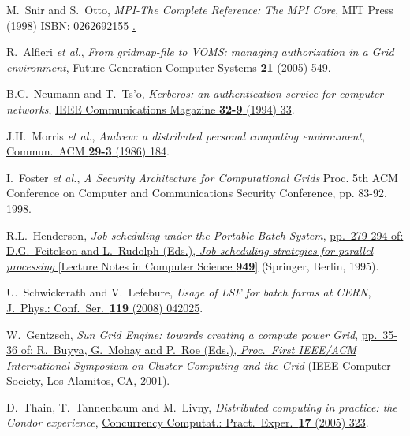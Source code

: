 \documentclass{elsart}
\def\etal {\textit{et al.}}
\begin{document}
\begin{linenumbers}
\begin{thebibliography}{00}
 M.~Snir and S.~Otto, \textit{MPI-The Complete Reference: The MPI Core}, 
{MIT Press (1998) ISBN: 0262692155}
\href{http://www.mpi-forum.org}.


 R.~Alfieri \etal,
\textit{From gridmap-file to VOMS: managing authorization in a Grid
environment},
\href{http://dx.doi.org/10.1016/j.future.2004.10.006}
{Future Generation Computer Systems \textbf{21} (2005) 549.}

 B.C.~Neumann and T.~Ts'o,
\textit{Kerberos: an authentication service for computer networks},
\href{http://dx.doi.org/10.1109/35.312841}
{IEEE Communications Magazine \textbf{32-9} (1994) 33}.

 J.H.~Morris \etal,
\textit{Andrew: a distributed personal computing environment},
\href{http://dx.doi.org/10.1145/5666.5671}
{Commun.\ ACM \textbf{29-3} (1986) 184}.

 I.~Foster \etal,
\textit{A Security Architecture for Computational Grids}
{Proc. 5th ACM Conference on Computer and Communications Security Conference, pp. 83-92, 1998.}


 R.L.~Henderson,
\textit{Job scheduling under the Portable Batch System},
\href{http://dx.doi.org/10.1007/3-540-60153-8}
{pp.~279-294 of: D.G.~Feitelson and L.~Rudolph (Eds.),
\textit{Job scheduling strategies for parallel processing}
[Lecture Notes in Computer Science \textbf{949}]} (Springer, Berlin, 1995).

 U.~Schwickerath and V.~Lefebure,
\textit{Usage of LSF for batch farms at CERN},
\href{http://dx.doi.org/10.1088/1742-6596/119/4/042025}
{J.~Phys.: Conf.\ Ser.\ \textbf{119} (2008) 042025}.

 W.~Gentzsch,
\textit{Sun Grid Engine: towards creating a compute power Grid},
\href{http://dx.doi.org/10.1109/CCGRID.2001.923173}
{pp.~35-36 of: R.~Buyya, G.~Mohay and P.~Roe (Eds.),
\textit{Proc.\ First IEEE/ACM International Symposium on Cluster
Computing and the Grid}} (IEEE Computer Society, Los Alamitos, CA, 2001).

 D.~Thain, T.~Tannenbaum and M.~Livny,
\textit{Distributed computing in practice: the Condor experience},
\href{http://dx.doi.org/10.1002/cpe.938}
{Concurrency Computat.: Pract.\ Exper.\ \textbf{17} (2005) 323}.


\end{thebibliography}
\end{linenumbers}
\end{document}
